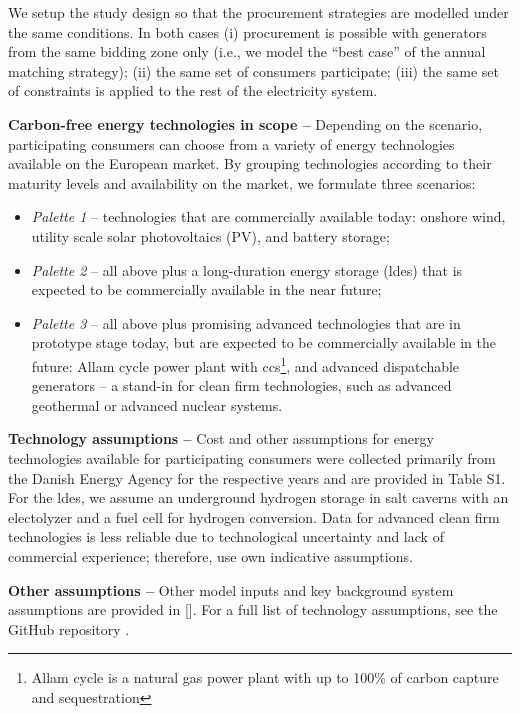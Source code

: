We setup the study design so that the procurement strategies are modelled under the same conditions.
In both cases (i) procurement is possible with generators from the same bidding zone only (i.e., we model the \enquote{best case} of the annual matching strategy); (ii) the same set of consumers participate; (iii) the same set of constraints is applied to the rest of the electricity system.

\textbf{Carbon-free energy technologies in scope --} Depending on the scenario, participating consumers can choose from a variety of energy technologies available on the European market. By grouping technologies according to their maturity levels and availability on the market, we formulate three scenarios:

\begin{itemize}[-]
    \item \textit{Palette 1} -- technologies that are commercially available today: onshore wind, utility scale solar photovoltaics (\gls{PV}), and battery storage;
    \item \textit{Palette 2} -- all above plus a long-duration energy storage (\gls{ldes}) that is expected to be commercially available in the near future; 
    \item \textit{Palette 3} -- all above plus promising advanced technologies that are in prototype stage today, but are expected to be commercially available in the future: Allam cycle power plant with \gls{ccs}\footnote{Allam cycle is a natural gas power plant with up to 100\% of carbon capture and sequestration}, and advanced dispatchable generators -- a stand-in for clean firm technologies, such as advanced geothermal or advanced nuclear systems.
\end{itemize}

\textbf{Technology assumptions --} Cost and other assumptions for energy technologies available for participating consumers were collected primarily from the Danish Energy Agency \cite{DEA-technologydata} for the respective years and are provided in Table S1. 
For the \gls{ldes}, we assume an underground hydrogen storage in salt caverns with an electolyzer and a fuel cell for hydrogen conversion. 
Data for advanced clean firm technologies is less reliable due to technological uncertainty and lack of commercial experience; therefore, use own indicative assumptions.

\textbf{Other assumptions --} Other model inputs and key background system assumptions are provided in []. For a full list of technology assumptions, see the GitHub repository \cite{github-247CFEpaper}.